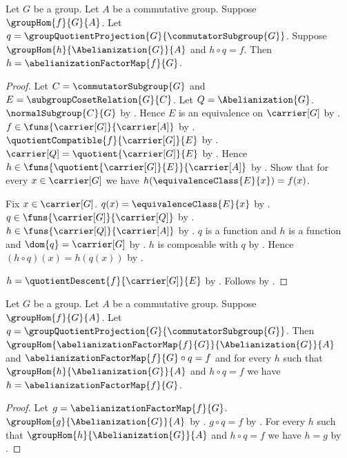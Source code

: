 \begin{theorem}\label{abelianization_factor_unique}
    Let $G$ be a group.
    Let $A$ be a commutative group.
    Suppose $\groupHom{f}{G}{A}$.
    Let $q=\groupQuotientProjection{G}{\commutatorSubgroup{G}}$.
    Suppose $\groupHom{h}{\Abelianization{G}}{A}$ and $h\circ q=f$.
    Then $h=\abelianizationFactorMap{f}{G}$.
\end{theorem}
\begin{proof}
    Let $C=\commutatorSubgroup{G}$ and
        $E=\subgroupCosetRelation{G}{C}$.
    Let $Q=\Abelianization{G}$.
    $\normalSubgroup{C}{G}$ by .
    Hence $E$ is an equivalence on $\carrier[G]$ by
        .
    $f\in\funs{\carrier[G]}{\carrier[A]}$ by
        .
    $\quotientCompatible{f}{\carrier[G]}{E}$ by
        .
    $\carrier[Q]=\quotient{\carrier[G]}{E}$ by
        .
    Hence $h\in\funs{\quotient{\carrier[G]}{E}}{\carrier[A]}$ by
        .
    Show that for every $x\in\carrier[G]$ we have
        $h(\equivalenceClass{E}{x})=f(x)$.
    \begin{subproof}
        Fix $x\in\carrier[G]$.
        $q(x)=\equivalenceClass{E}{x}$ by
            .
        $q\in\funs{\carrier[G]}{\carrier[Q]}$ by
            .
        $h\in\funs{\carrier[Q]}{\carrier[A]}$ by
            .
        $q$ is a function and $h$ is a function and
            $\dom{q}=\carrier[G]$ by .
        $h$ is composable with $q$ by
            .
        Hence $(h\circ q)(x)=h(q(x))$ by .
    \end{subproof}
    $h=\quotientDescent{f}{\carrier[G]}{E}$ by
        .
    Follows by .
\end{proof}

\begin{theorem}\label{abelianization_universal_property}
    Let $G$ be a group.
    Let $A$ be a commutative group.
    Suppose $\groupHom{f}{G}{A}$.
    Let $q=\groupQuotientProjection{G}{\commutatorSubgroup{G}}$.
    Then
        $\groupHom
            {\abelianizationFactorMap{f}{G}}{\Abelianization{G}}{A}$ and
        $\abelianizationFactorMap{f}{G}\circ q=f$ and for every $h$
        such that $\groupHom{h}{\Abelianization{G}}{A}$ and $h\circ q=f$
        we have $h=\abelianizationFactorMap{f}{G}$.
\end{theorem}
\begin{proof}
    Let $g=\abelianizationFactorMap{f}{G}$.
    $\groupHom{g}{\Abelianization{G}}{A}$ by
        .
    $g\circ q=f$ by .
    For every $h$ such that
        $\groupHom{h}{\Abelianization{G}}{A}$ and $h\circ q=f$
        we have $h=g$ by .
\end{proof}

